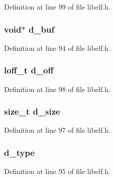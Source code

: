 \-Definition at line 99 of file libelf.\-h.

\hypertarget{struct_elf___data_a1359b01d51e81c439649e50e0228dbd7}{
\subsubsection[{d\-\_\-buf}]{\setlength{\rightskip}{0pt plus 5cm}void$\ast$ {\bf d\-\_\-buf}}}\label{struct_elf___data_a1359b01d51e81c439649e50e0228dbd7}


\-Definition at line 94 of file libelf.\-h.

\hypertarget{struct_elf___data_a76ed4b4aeb474d605e84a4320f054248}{
\subsubsection[{d\-\_\-off}]{\setlength{\rightskip}{0pt plus 5cm}loff\-\_\-t {\bf d\-\_\-off}}}\label{struct_elf___data_a76ed4b4aeb474d605e84a4320f054248}


\-Definition at line 98 of file libelf.\-h.

\hypertarget{struct_elf___data_a30bc3455be56d05848d0a0f737d72cf5}{
\subsubsection[{d\-\_\-size}]{\setlength{\rightskip}{0pt plus 5cm}size\-\_\-t {\bf d\-\_\-size}}}\label{struct_elf___data_a30bc3455be56d05848d0a0f737d72cf5}


\-Definition at line 97 of file libelf.\-h.

\hypertarget{struct_elf___data_a376952c5e9c01e467788dcfc62216771}{
\subsubsection[{d\-\_\-type}]{ {\bf d\-\_\-type}}}\label{struct_elf___data_a376952c5e9c01e467788dcfc62216771}


\-Definition at line 95 of file libelf.\-h.

